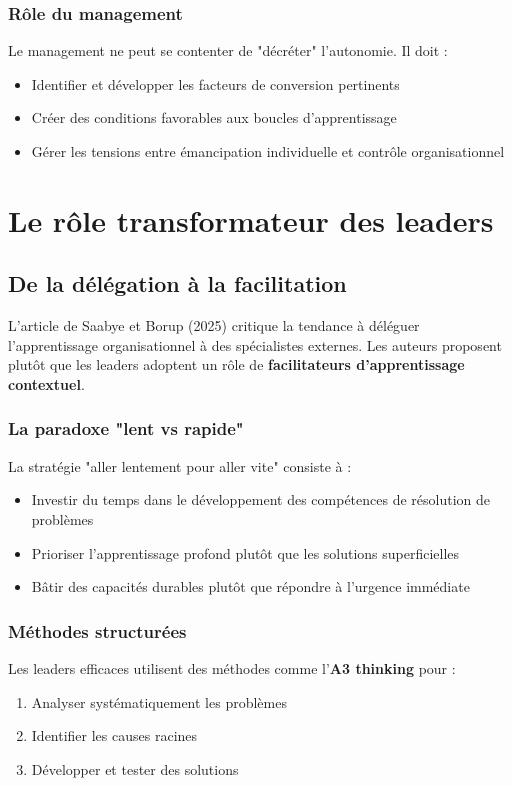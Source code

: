 \documentclass[12pt,a4paper]{article}
\begin{document}
\subsubsection{Rôle du management}
Le management ne peut se contenter de "décréter" l'autonomie. Il doit :
\begin{itemize}
    \item Identifier et développer les facteurs de conversion pertinents
    \item Créer des conditions favorables aux boucles d'apprentissage
    \item Gérer les tensions entre émancipation individuelle et contrôle organisationnel
\end{itemize}

\section{Le rôle transformateur des leaders}

\subsection{De la délégation à la facilitation}

L'article de Saabye et Borup (2025) critique la tendance à déléguer l'apprentissage organisationnel à des spécialistes externes. Les auteurs proposent plutôt que les leaders adoptent un rôle de \textbf{facilitateurs d'apprentissage contextuel}.

\subsubsection{La paradoxe "lent vs rapide"}
La stratégie "aller lentement pour aller vite" consiste à :
\begin{itemize}
    \item Investir du temps dans le développement des compétences de résolution de problèmes
    \item Prioriser l'apprentissage profond plutôt que les solutions superficielles
    \item Bâtir des capacités durables plutôt que répondre à l'urgence immédiate
\end{itemize}

\subsubsection{Méthodes structurées}
Les leaders efficaces utilisent des méthodes comme l'\textbf{A3 thinking} pour :
\begin{enumerate}
    \item Analyser systématiquement les problèmes
    \item Identifier les causes racines
    \item Développer et tester des solutions
\end{enumerate}
\end{document}
